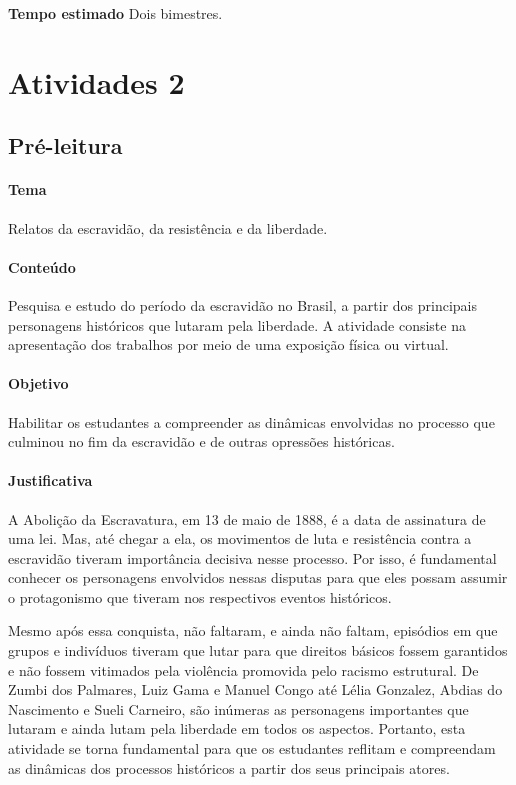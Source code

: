\documentclass[12pt]{extarticle}
\begin{document}
\textbf{Tempo estimado} Dois bimestres.

\section{Atividades 2}

\subsection{Pré-leitura}

\paragraph{Tema} Relatos da escravidão, da resistência e da liberdade.
  

\paragraph{Conteúdo} Pesquisa e estudo do período da escravidão no Brasil,
a partir dos principais personagens históricos que lutaram pela
liberdade. A atividade consiste na apresentação dos trabalhos por meio
de uma exposição física ou virtual.

\paragraph{Objetivo} Habilitar os estudantes a compreender as dinâmicas
envolvidas no processo que culminou no fim da escravidão e de outras
opressões históricas.

\paragraph{Justificativa} A Abolição da Escravatura, em 13 de maio de
1888, é a data de assinatura de uma lei. Mas, até chegar a ela, os
movimentos de luta e resistência contra a escravidão tiveram importância
decisiva nesse processo. Por isso, é fundamental conhecer os personagens
envolvidos nessas disputas para que eles possam assumir o protagonismo
que tiveram nos respectivos eventos históricos.




Mesmo após essa conquista, não faltaram, e ainda não faltam, episódios
em que grupos e indivíduos tiveram que lutar para que direitos básicos
fossem garantidos e não fossem vitimados pela violência promovida pelo
racismo estrutural. De Zumbi dos Palmares, Luiz Gama e Manuel Congo até
Lélia Gonzalez, Abdias do Nascimento e Sueli Carneiro, são inúmeras as
personagens importantes que lutaram e ainda lutam pela liberdade em
todos os aspectos. Portanto, esta atividade se torna fundamental para
que os estudantes reflitam e compreendam as dinâmicas dos processos
históricos a partir dos seus principais atores.
\end{document}
